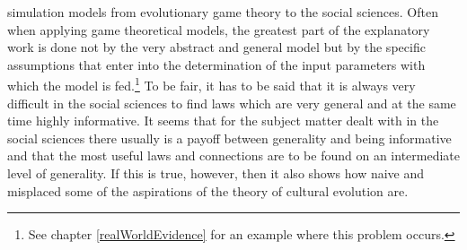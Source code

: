 simulation models from evolutionary game theory to the social
sciences. Often when applying game theoretical models, the greatest
part of the explanatory work is done not by the very abstract and
general model but by the specific assumptions that enter into the
determination of the input parameters with which the model is
fed.\footnote{See chapter \ref{realWorldEvidence} for an example where
  this problem occurs.} To be fair, it has to be said that it is
always very difficult in the social sciences to find laws which are
very general and at the same time highly informative. It seems that
for the subject matter dealt with in the social sciences there usually
is a payoff between generality and being informative and that the most
useful laws and connections are to be found on an intermediate level
of generality. If this is true, however, then it also shows how naive
and misplaced some of the aspirations of the theory of cultural
evolution are.

